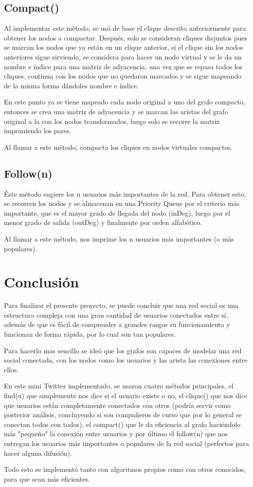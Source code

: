 \documentclass[12pt]{article}
\begin{document}
\subsection{Compact()}

\indent\indent Al implementar este método, se usó de base el clique descrito anteriormente para obtener los nodos a compactar. Después, solo se consideran cliques disjuntos pues se marcan los nodos que ya están en un clique anterior, si el clique sin los nodos anteriores sigue sirviendo, se considera para hacer un nodo virtual y se le da un nombre e índice para una matriz de adyacencia, una vez que se repasa todos los cliques, continua con los nodos que no quedaron marcados y se sigue mapeando de la misma forma dándoles nombre e índice. 

En este punto ya se tiene mapeado cada nodo original a uno del grafo compacto, entonces se crea una matriz de adyacencia y se marcan las aristas del grafo original a la con los nodos transformados, luego solo se recorre la matriz imprimiendo los pares.

Al llamar a este método, compacta los cliques en nodos virtuales compactos.

\subsection{Follow(n)}

Éste método sugiere los n usuarios más importantes de la red.
Para obtener esto, se recorren los nodos y se almacenan en una Priority Queue por el criterio más importante, que es el mayor grado de llegada del nodo (inDeg), luego por el menor grado de salida (outDeg) y finalmente por orden alfabético.

Al llamar a este método, nos imprime los n usuarios más importantes (o más populares).

\newpage
\section{Conclusión}
\indent \indent Para finalizar el presente proyecto, se puede concluir que una red social es una estructura compleja con una gran cantidad de usuarios conectados entre sí, además de que es fácil de comprender a grandes rasgos su funcionamiento y funcionan de forma rápida, por lo cual son tan populares.

Para hacerlo mas sencillo se ideó que los grafos son capaces de modelar una red social conectada, con los nodos como los usuarios y las arista las conexiones entre ellos.

En este mini Twitter implementado, se usaron cuatro métodos principales, el find(u) que simplemente nos dice si el usuario existe o no, el clique() que nos dice que usuarios están completamente conectados con otros (podría servir como posterior análisis, concluyendo si son compañeros de curso que por lo general se conectan todos con todos), el compact() que le da eficiencia al grafo haciéndolo más "pequeño" la conexión entre usuarios y por último el follow(n) que nos entregan los usuarios más importantes o populares de la red social (perfectos para hacer alguna difusión).

Todo esto se implementó tanto con algoritmos propios como con otros conocidos, para que sean más eficientes.
\end{document}
